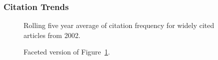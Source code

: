 \documentclass[
  10pt,
  letterpaper,
  DIV=11,
  numbers=noendperiod,
  twoside]{scrartcl}
\begin{document}
\subsubsection*{Citation Trends}\label{citation-trends-26}

\begin{figure}


\caption{\label{fig-citation-spaghetti-2002}Rolling five year average of
citation frequency for widely cited articles from 2002.}

\end{figure}%

\begin{figure}


\caption{\label{fig-citation-facet-2002}Faceted version of
Figure~\ref{fig-citation-spaghetti-2002}.}

\end{figure}%
\end{document}
